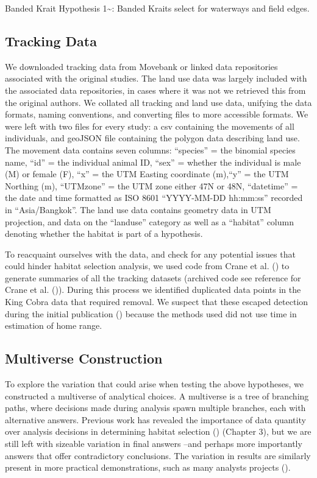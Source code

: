 \documentclass[10pt,a4paper]{article}
\begin{document}
Banded Krait Hypothesis 1\textasciitilde: Banded Kraits select for waterways and field edges.

\subsection{Tracking Data}\label{tracking-data}

We downloaded tracking data from Movebank or linked data repositories associated with the original studies.
The land use data was largely included with the associated data repositories, in cases where it was not we retrieved this from the original authors.
We collated all tracking and land use data, unifying the data formats, naming conventions, and converting files to more accessible formats.
We were left with two files for every study: a csv containing the movements of all individuals, and geoJSON file containing the polygon data describing land use.
The movement data contains seven columns: ``species'' = the binomial species name, ``id'' = the individual animal ID, ``sex'' = whether the individual is male (M) or female (F), ``x'' = the UTM Easting coordinate (m),``y'' = the UTM Northing (m), ``UTMzone'' = the UTM zone either 47N or 48N, ``datetime'' = the date and time formatted as ISO 8601 ``YYYY-MM-DD hh:mm:ss'' recorded in ``Asia/Bangkok''.
The land use data contains geometry data in UTM projection, and data on the ``landuse'' category as well as a ``habitat'' column denoting whether the habitat is part of a hypothesis.

To reacquaint ourselves with the data, and check for any potential issues that could hinder habitat selection analysis, we used code from Crane et al. () to generate summaries of all the tracking datasets (archived code see reference for Crane et al. ()).
During this process we identified duplicated data points in the King Cobra data that required removal.
We suspect that these escaped detection during the initial publication () because the methods used did not use time in estimation of home range.

\subsection{Multiverse Construction}\label{multiverse-construction}

To explore the variation that could arise when testing the above hypotheses, we constructed a multiverse of analytical choices.
A multiverse is a tree of branching paths, where decisions made during analysis spawn multiple branches, each with alternative answers.
Previous work has revealed the importance of data quantity over analysis decisions in determining habitat selection () (Chapter 3), but we are still left with sizeable variation in final answers --and perhaps more importantly answers that offer contradictory conclusions.
The variation in results are similarly present in more practical demonstrations, such as many analysts projects ().
\end{document}

